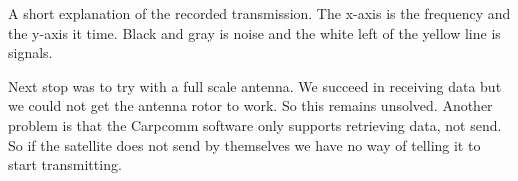 A short explanation of the recorded transmission. The x-axis is the frequency and the y-axis it time. Black and gray is noise and the white left of the yellow line is signals.  

 Next stop was to try with a full scale antenna. We succeed in receiving data but we could not get the antenna rotor to work. So this remains unsolved. Another problem is that the Carpcomm software only supports retrieving data, not send. So if the satellite does not send by themselves we have no way of telling it to start transmitting. 




